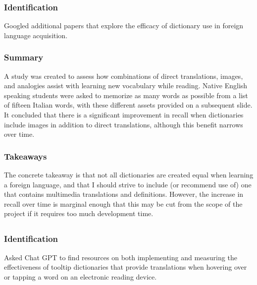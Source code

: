 \documentclass[
	letterpaper, %
]{jdf}
\begin{document}
\subsubsection{Identification}
Googled additional papers that explore the efficacy of dictionary use in foreign language acquisition.

\subsubsection{Summary}
A study was created to assess how combinations of direct translations, images, and analogies assist with learning new vocabulary while reading. Native English speaking students were asked to memorize as many words as possible from a list of fifteen Italian words, with these different assets provided on a subsequent slide. It concluded that there is a significant improvement in recall when dictionaries include images in addition to direct translations, although this benefit narrows over time.

\subsubsection{Takeaways}
The concrete takeaway is that not all dictionaries are created equal when learning a foreign language, and that I should strive to include (or recommend use of) one that contains multimedia translations and definitions. However, the increase in recall over time is marginal enough that this may be cut from the scope of the project if it requires too much development time.

\subsection{}
\subsubsection{Identification}
Asked Chat GPT to find resources on both implementing and measuring the effectiveness of tooltip dictionaries that provide translations when hovering over or tapping a word on an electronic reading device.
\end{document}
